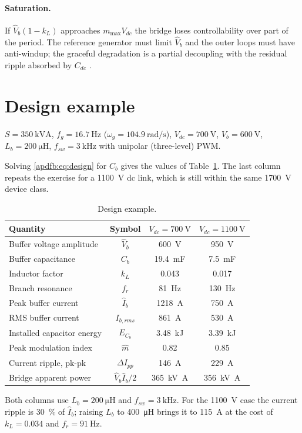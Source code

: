 \paragraph{Saturation.} If $\hat V_b(1-k_L)$ approaches $m_{\max}V_{dc}$ the
bridge loses controllability over part of the period. The reference generator
must limit $\hat V_b$ and the outer loops must have anti-windup; the graceful
degradation is a partial decoupling with the residual ripple absorbed by
$C_{dc}$ \cite{neumayr2021partial}.

\section{Design example}

$S=\SI{350}{\kilo\volt\ampere}$, $f_g=\SI{16.7}{\hertz}$
($\omega_g=\SI{104.9}{\radian\per\second}$), $V_{dc}=\SI{700}{\volt}$,
$\hat V_b=\SI{600}{\volt}$, $L_b=\SI{200}{\micro\henry}$,
$f_{sw}=\SI{3}{\kilo\hertz}$ with unipolar (three-level) PWM.

Solving \eqref{apdfb:eq:design} for $C_b$ gives the values of
Table~\ref{apdfb:tab:design}. The last column repeats the exercise for a
\SI{1100}{\volt} dc link, which is still within the same
\SI{1700}{\volt} device class.

\begin{table}[htb]
\centering
\caption{Design example.}
\label{apdfb:tab:design}
\begin{tabular}{lccc}
\toprule
Quantity & Symbol & $V_{dc}=\SI{700}{\volt}$ & $V_{dc}=\SI{1100}{\volt}$ \\
\midrule
Buffer voltage amplitude & $\hat V_b$ & \SI{600}{\volt} & \SI{950}{\volt} \\
Buffer capacitance & $C_b$ & \SI{19.4}{\milli\farad} & \SI{7.5}{\milli\farad} \\
Inductor factor & $k_L$ & 0.043 & 0.017 \\
Branch resonance & $f_r$ & \SI{81}{\hertz} & \SI{130}{\hertz} \\
Peak buffer current & $\hat I_b$ & \SI{1218}{\ampere} & \SI{750}{\ampere} \\
RMS buffer current & $I_{b,rms}$ & \SI{861}{\ampere} & \SI{530}{\ampere} \\
Installed capacitor energy & $E_{C_b}$ & \SI{3.48}{\kilo\joule} & \SI{3.39}{\kilo\joule} \\
Peak modulation index & $\hat m$ & 0.82 & 0.85 \\
Current ripple, pk-pk & $\Delta I_{pp}$ & \SI{146}{\ampere} & \SI{229}{\ampere} \\
Bridge apparent power & $\hat V_b\hat I_b/2$ & \SI{365}{\kilo\volt\ampere} & \SI{356}{\kilo\volt\ampere} \\
\bottomrule
\end{tabular}

\vspace{2mm}
{\footnotesize Both columns use $L_b=\SI{200}{\micro\henry}$ and
$f_{sw}=\SI{3}{\kilo\hertz}$. For the \SI{1100}{\volt} case the current
ripple is \SI{30}{\percent} of $\hat I_b$; raising $L_b$ to
\SI{400}{\micro\henry} brings it to \SI{115}{\ampere} at the cost of
$k_L=0.034$ and $f_r=\SI{91}{\hertz}$.}
\end{table}

